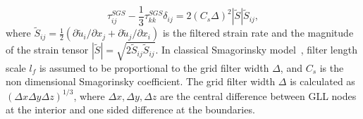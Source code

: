 \begin{equation}
\tau^{SGS}_{ij} - \frac{1}{3}\tau^{SGS}_{kk}\delta_{ij} = 2(C_s\Delta)^2|\widetilde{S}|\widetilde{S}_{ij}, \label{sgs}
\end{equation}
where $\widetilde{S}_{ij} = \frac{1}{2}({\partial \widetilde{u}_i}/{\partial x_j}+ {\partial \widetilde{u}_j}/{\partial x_i})$ is the filtered strain rate and the magnitude of the strain tensor $|\widetilde{S}| = \sqrt{2\widetilde{S}_{ij}\widetilde{S}_{ij}}$. In classical Smagorinsky model~\cite{smagorinsky}, filter length scale $l_f$ is assumed to be proportional to the grid filter width $\Delta$, and $C_s$ is the non dimensional Smagorinsky coefficient. The grid filter width $\Delta$ is calculated as $(\Delta x\Delta y\Delta z)^{1/3}$, where $\Delta x, \Delta y, \Delta z$ are the central difference between GLL nodes at the interior and one sided difference at the boundaries.\\

